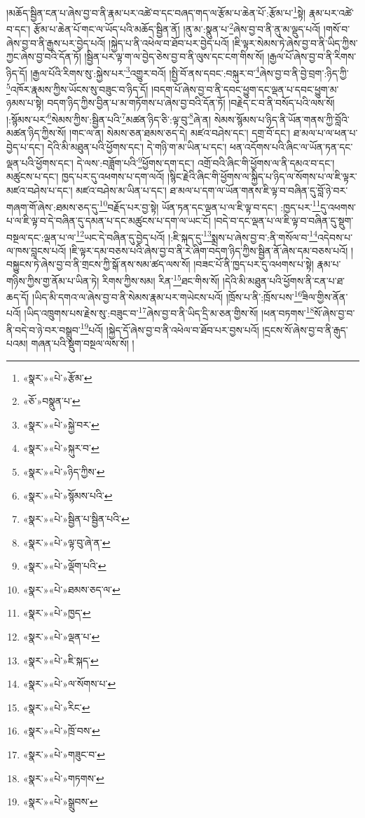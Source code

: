 །མཆོད་སྦྱིན་ངན་པ་ཞེས་བྱ་བ་ནི་རྣམ་པར་འཚེ་བ་དང་བཞད་གད་ལ་རྩོམ་པ་ཆེན་པོ་:རྩོམ་པ་\footnote{«སྣར་»«པེ་»རྩོམ་}སྟེ། རྣམ་པར་འཚེ་བ་དང་། རྩོམ་པ་ཆེན་པོ་གང་ལ་ཡོད་པའི་མཆོད་སྦྱིན་ནོ། །ནུ་མ་:སྣུན་པ་\footnote{«ཅོ་»བསྣུན་པ་}ཞེས་བྱ་བ་ནི་ནུ་མ་ལྡུད་པའོ། །གསོ་བ་ཞེས་བྱ་བ་ནི་རྒྱས་པར་བྱེད་པའོ། །སྐྱེད་པ་ནི་འཕེལ་བ་ཐོབ་པར་བྱེད་པའོ། །ཇི་ལྟར་སེམས་ཏེ་ཞེས་བྱ་བ་ནི་ཡིད་ཀྱིས་ཀྱང་ཞེས་བྱ་བའི་དོན་ཏོ། །སྦྱིན་པར་ལྟ་ག་ལ་བྱེད་ཅེས་བྱ་བ་ནི་ལུས་དང་ངག་གིས་སོ། །རྒྱལ་པོ་ཞེས་བྱ་བ་ནི་རིགས་ཉིད་དོ། །རྒྱལ་པོའི་རིགས་སུ་:སྐྱེས་པར་\footnote{«སྣར་»«པེ་»སྐྱེ་བར་}འགྱུར་བའོ། །སྤྱི་བོ་ནས་དབང་:བསྐུར་བ་\footnote{«སྣར་»«པེ་»སྐུར་བ་}ཞེས་བྱ་བ་ནི་བྱེ་བྲག་:ཉིད་ཀྱི་\footnote{«སྣར་»«པེ་»ཉིད་ཀྱིས་}འཁོར་རྣམས་ཀྱིས་ཡོངས་སུ་བཟུང་བ་ཉིད་དོ། །བདག་པོ་ཞེས་བྱ་བ་ནི་དབང་ཕྱུག་དང་ལྡན་པ་དབང་ཕྱུག་མ་ཉམས་པ་སྟེ། བདག་ཉིད་ཀྱིས་བྱིན་པ་མ་གཏོགས་པ་ཞེས་བྱ་བའི་དོན་ཏོ། །བརྗེད་ང་བ་ནི་བསོད་པའི་ལས་སོ། །:སྙོམས་པར་\footnote{«སྣར་»«པེ་»སྙོམས་པའི་}སེམས་ཀྱིས་:སྦྱིན་པའི་\footnote{«སྣར་»«པེ་»སྦྱིན་པ་སྦྱིན་པའི་}མཚན་ཉིད་ཅི་:ལྟ་བུ་\footnote{«སྣར་»«པེ་»ལྟ་བུ་ཞེ་ན་}ཞེ་ན། སེམས་སྙོམས་པ་ཉིད་ནི་ཡོན་གནས་ཀྱི་བློའི་མཚན་ཉིད་ཀྱིས་སོ། །གང་ལ་ན། སེམས་ཅན་ཐམས་ཅད་དེ། མཛའ་བཤེས་དང་། དགྲ་བོ་དང་། ཐ་མལ་པ་ལ་ཕན་པ་བྱེད་པ་དང་། དེའི་མི་མཐུན་པའི་ཕྱོགས་དང་། དེ་གཉི་ག་མ་ཡིན་པ་དང་། ཕན་འདོགས་པའི་ཞིང་ལ་ཡོན་ཏན་དང་ལྡན་པའི་ཕྱོགས་དང་། དེ་ལས་:བཟློག་པའི་\footnote{«སྣར་»«པེ་»ལྡོག་པའི་}ཕྱོགས་དག་དང་། འགྲོ་བའི་ཞིང་གི་ཕྱོགས་ལ་ནི་དམའ་བ་དང་། མཚུངས་པ་དང་། ཁྱད་པར་དུ་འཕགས་པ་དག་ལའོ། །སྙིང་རྗེའི་ཞིང་གི་ཕྱོགས་ལ་སྐྱིད་པ་ཉིད་ལ་སོགས་པ་ལ་ཇི་ལྟར་མཛའ་བཤེས་པ་དང་། མཛའ་བཤེས་མ་ཡིན་པ་དང་། ཐ་མལ་པ་དག་ལ་ཡོན་གནས་ཇི་ལྟ་བ་བཞིན་དུ་བློ་ཉེ་བར་གཞག་གོ་ཞེས་:ཐམས་ཅད་དུ་\footnote{«སྣར་»«པེ་»ཐམས་ཅད་ལ་}བརྗོད་པར་བྱ་སྟེ། ཡོན་ཏན་དང་ལྡན་པ་ལ་ཇི་ལྟ་བ་དང་། :ཁྱད་པར་\footnote{«སྣར་»«པེ་»ཁྱད་}དུ་འཕགས་པ་ལ་ཇི་ལྟ་བ་དེ་བཞིན་དུ་དམན་པ་དང་མཚུངས་པ་དག་ལ་ཡང་ངོ། །བདེ་བ་དང་ལྡན་པ་ལ་ཇི་ལྟ་བ་བཞིན་དུ་སྡུག་བསྔལ་དང་:ལྡན་པ་ལ་\footnote{«སྣར་»«པེ་»ལྡན་པ་}ཡང་དེ་བཞིན་དུ་བྱེད་པའོ། །:ཇི་སྐད་དུ་\footnote{«སྣར་»«པེ་»ཇི་སྐད་}སྨྲས་པ་ཞེས་བྱ་བ་:ནི་གསོལ་བ་\footnote{«སྣར་»«པེ་»ལ་སོགས་པ་}འདེབས་པ་ལ་ཁས་བླངས་པའོ། །ཇི་ལྟར་དམ་བཅས་པའི་ཞེས་བྱ་བ་ནི་རེ་ཞིག་བདག་ཉིད་ཀྱིས་སྦྱིན་ནོ་ཞེས་དམ་བཅས་པའོ། །བསྐྱུངས་ཏེ་ཞེས་བྱ་བ་ནི་གྲངས་ཀྱི་སྒོ་ནས་སམ་ཚད་ལས་སོ། །བཟང་པོ་ནི་ཁྱད་པར་དུ་འཕགས་པ་སྟེ། རྣམ་པ་གཉིས་ཀྱིས་གྱ་ནོམ་པ་ཡིན་ཏེ། རིགས་ཀྱིས་སམ། རིན་\footnote{«སྣར་»«པེ་»རིང་}ཐང་གིས་སོ། །དེའི་མི་མཐུན་པའི་ཕྱོགས་ནི་ངན་པ་ཐ་ཆད་དོ། །ཡིད་མི་དགའ་ལ་ཞེས་བྱ་བ་ནི་སེམས་རྣམ་པར་གཡེངས་པའོ། །ཁྲོས་པ་ནི་:ཁྲོས་པས་\footnote{«སྣར་»«པེ་»ཁྲོ་བས་}ཟིལ་གྱིས་ནོན་པའོ། །ཡིད་འཁྲུགས་པས་རྗེས་སུ་:བཟུང་བ་\footnote{«སྣར་»«པེ་»གཟུང་བ་}ཞེས་བྱ་བ་ནི་ཡིད་དྲི་མ་ཅན་གྱིས་སོ། །ཕན་བཏགས་\footnote{«སྣར་»«པེ་»གཏགས་}སོ་ཞེས་བྱ་བ་ནི་བདེ་བ་ཉེ་བར་བསྒྲུབ་\footnote{«སྣར་»«པེ་»སྒྲུབས་}པའོ། །སྐྱེད་དོ་ཞེས་བྱ་བ་ནི་འཕེལ་བ་ཐོབ་པར་བྱས་པའོ། །དྲངས་སོ་ཞེས་བྱ་བ་ནི་རྒུད་པའམ། གཞན་པའི་སྡུག་བསྔལ་ལས་སོ། །

